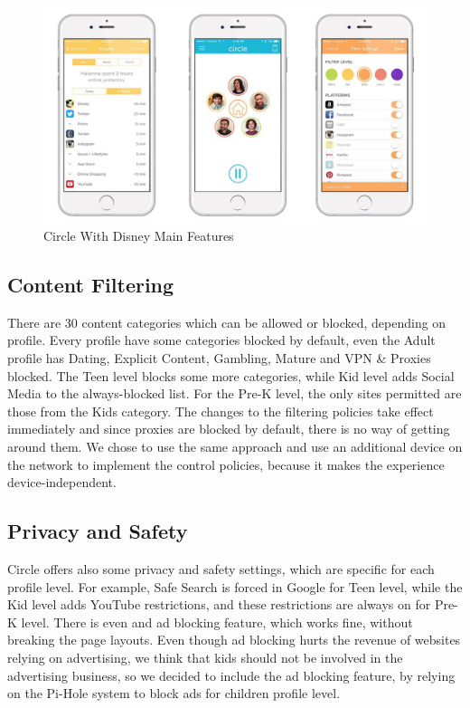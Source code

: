 \begin{figure}[th]
\centering
\includegraphics[width=1\textwidth]{Figures/circle}
\decoRule
\caption{Circle With Disney Main Features}
\label{fig:circle}
\end{figure}

\subsection{Content Filtering}

There are 30 content categories which can be allowed or blocked, depending on profile. Every profile have some categories blocked by default, even the Adult profile has Dating, Explicit Content, Gambling, Mature and VPN \& Proxies blocked. The Teen level blocks some more categories, while Kid level adds Social Media to the always-blocked list. For the Pre-K level, the only sites permitted are those from the Kids category. The changes to the filtering policies take effect immediately and since proxies are blocked by default, there is no way of getting around them. We chose to use the same approach and use an additional device on the network to implement the control policies, because it makes the experience device-independent.

\subsection{Privacy and Safety}

Circle offers also some privacy and safety settings, which are specific for each profile level. For example, Safe Search is forced in Google for Teen level, while the Kid level adds YouTube restrictions, and these restrictions are always on for Pre-K level.
There is even and ad blocking feature, which works fine, without breaking the page layouts. Even though ad blocking hurts the revenue of websites relying on advertising, we think that kids should not be involved in the advertising business, so we decided to include the ad blocking feature, by relying on the Pi-Hole system to block ads for children profile level.

